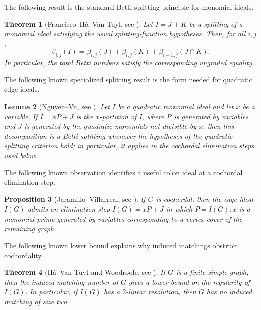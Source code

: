 \documentclass[12pt]{article}
\newtheorem{theorem}{Theorem}[section]
\newtheorem{lemma}[theorem]{Lemma}
\newtheorem{proposition}[theorem]{Proposition}
\theoremstyle{definition}
\begin{document}
\medskip

The following result is the standard Betti-splitting principle for monomial ideals.
\begin{theorem}[Francisco--H\`a--Van Tuyl, see \cite{FranciscoHaVanTuyl2009}]\label{thm:betti-splitting-known}
Let $I=J+K$ be a splitting of a monomial ideal satisfying the usual splitting-function hypotheses.  Then, for all $i,j$,
$$
\beta_{i,j}(I)=\beta_{i,j}(J)+\beta_{i,j}(K)+\beta_{i-1,j}(J\cap K).
$$
In particular, the total Betti numbers satisfy the corresponding ungraded equality.
\end{theorem}

\medskip

The following known specialized splitting result is the form needed for quadratic edge ideals.
\begin{lemma}[Nguyen--Vu, see \cite{NguyenVu2016}]\label{lem:x-partition}
Let $I$ be a quadratic monomial ideal and let $x$ be a variable.  If $I=xP+J$ is the $x$-partition of $I$, where $P$ is generated by variables and $J$ is generated by the quadratic monomials not divisible by $x$, then this decomposition is a Betti splitting whenever the hypotheses of the quadratic splitting criterion hold; in particular, it applies in the cochordal elimination steps used below.
\end{lemma}

\medskip

The following known observation identifies a useful colon ideal at a cochordal elimination step.
\begin{proposition}[Jaramillo--Villarreal, see \cite{JaramilloVillarreal2021}]\label{prop:colon-prime-known}
If $G$ is cochordal, then the edge ideal $I(G)$ admits an elimination step $I(G)=xP+J$ in which $P=I(G):x$ is a monomial prime generated by variables corresponding to a vertex cover of the remaining graph.
\end{proposition}

\medskip

The following known lower bound explains why induced matchings obstruct cochordality.
\begin{theorem}[H\`a--Van Tuyl and Woodroofe, see \cite{HaVanTuyl2008,Woodroofe2014}]\label{thm:induced-matching-bound}
If $G$ is a finite simple graph, then the induced matching number of $G$ gives a lower bound on the regularity of $I(G)$.  In particular, if $I(G)$ has a $2$-linear resolution, then $G$ has no induced matching of size two.
\end{theorem}
\end{document}

